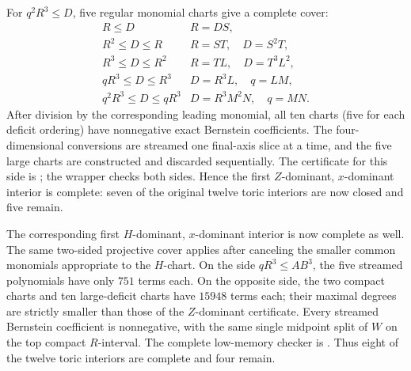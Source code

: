 \documentclass[11pt]{article}
\theoremstyle{remark}
\begin{document}
For \(q^2R^3\leq D\), five regular monomial charts give a complete cover:
\[
\begin{array}{c|c}
 R\leq D & R=DS,\\
 R^2\leq D\leq R & R=ST,\quad D=S^2T,\\
 R^3\leq D\leq R^2 & R=TL,\quad D=T^3L^2,\\
 qR^3\leq D\leq R^3 & D=R^3L,\quad q=LM,\\
 q^2R^3\leq D\leq qR^3 & D=R^3M^2N,\quad q=MN.
\end{array}
\]
After division by the corresponding leading monomial, all ten charts (five
for each deficit ordering) have nonnegative exact Bernstein coefficients.
The four-dimensional conversions are streamed one final-axis slice at a
time, and the five large charts are constructed and discarded sequentially.
The certificate for this side is
; the wrapper
 checks both sides.
Hence the first \(Z\)-dominant, \(x\)-dominant interior is complete: seven of
the original twelve toric interiors are now closed and five remain.

The corresponding first \(H\)-dominant, \(x\)-dominant interior is now
complete as well.  The same two-sided projective cover applies after
canceling the smaller common monomials appropriate to the \(H\)-chart.  On
the side \(qR^3\leq AB^3\), the five streamed polynomials have only \(751\)
terms each.  On the opposite side, the two compact charts and ten
large-deficit charts have \(15948\) terms each; their maximal degrees are
strictly smaller than those of the \(Z\)-dominant certificate.  Every
streamed Bernstein coefficient is nonnegative, with the same single
midpoint split of \(W\) on the top compact \(R\)-interval.  The complete
low-memory checker is
.  Thus eight of the
twelve toric interiors are complete and four remain.
\end{document}
